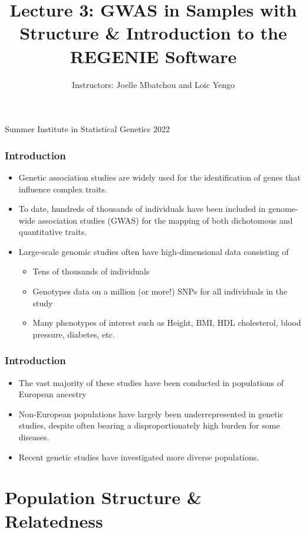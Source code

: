 \documentclass{beamer}
\title{Lecture 3: GWAS in Samples with Structure \& Introduction to the REGENIE Software}
\author{Instructors: Joelle Mbatchou and Loic Yengo}
\date{}
\begin{document}
	\begin{frame}
	\titlepage
	\vspace{-2cm}
	\begin{center}
		
		{ \Large Summer Institute in Statistical Genetics 2022\\}
		
		
	\end{center}
\end{frame}



\begin{frame}
\frametitle{\bf Introduction}
\begin{itemize}
\item Genetic association studies are widely used for the identification of genes that influence complex traits. 
\item To date, hundreds of thousands of individuals have been included in genome-wide association studies (GWAS) for the mapping of both dichotomous and quantitative traits.
\item Large-scale genomic studies often have high-dimensional data consisting of 
\begin{itemize}
\item Tens of thousands of individuals
\item Genotypes data on a million (or more!)  SNPs for all individuals in the study
\item  Many phenotypes of interest  such as Height, BMI, HDL cholesterol, blood pressure, diabetes, etc.
\end{itemize}
\end{itemize}
\end{frame}



\begin{frame}
\frametitle{\bf Introduction}
\begin{itemize}
\item  The vast majority of these studies have been conducted in  populations of European ancestry
\item Non-European populations have largely been underrepresented in genetic studies, despite often bearing a disproportionately high burden for some diseases. 
\item Recent genetic studies have investigated more diverse populations.
\end{itemize}
\end{frame}

\section{Population Structure \& Relatedness}
\end{document}
